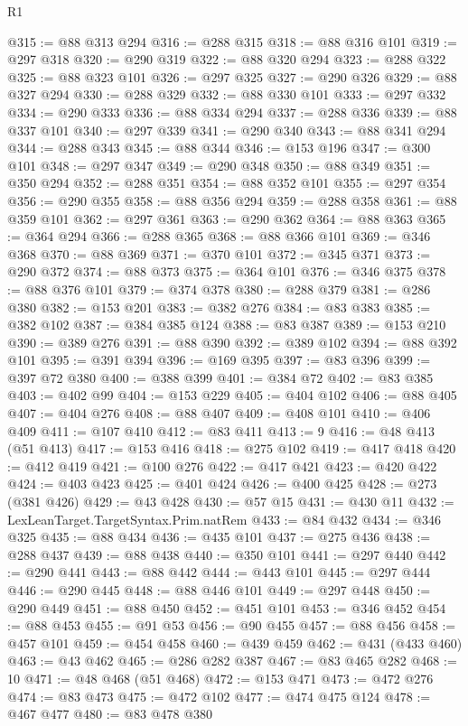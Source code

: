 \begin{lexlean}{R1}
\begin{coremodule}
@315 := @88 @313 @294
@316 := @288 @315
@318 := @88 @316 @101
@319 := @297 @318
@320 := @290 @319
@322 := @88 @320 @294
@323 := @288 @322
@325 := @88 @323 @101
@326 := @297 @325
@327 := @290 @326
@329 := @88 @327 @294
@330 := @288 @329
@332 := @88 @330 @101
@333 := @297 @332
@334 := @290 @333
@336 := @88 @334 @294
@337 := @288 @336
@339 := @88 @337 @101
@340 := @297 @339
@341 := @290 @340
@343 := @88 @341 @294
@344 := @288 @343
@345 := @88 @344
@346 := @153 @196
@347 := @300 @101
@348 := @297 @347
@349 := @290 @348
@350 := @88 @349
@351 := @350 @294
@352 := @288 @351
@354 := @88 @352 @101
@355 := @297 @354
@356 := @290 @355
@358 := @88 @356 @294
@359 := @288 @358
@361 := @88 @359 @101
@362 := @297 @361
@363 := @290 @362
@364 := @88 @363
@365 := @364 @294
@366 := @288 @365
@368 := @88 @366 @101
@369 := @346 @368
@370 := @88 @369
@371 := @370 @101
@372 := @345 @371
@373 := @290 @372
@374 := @88 @373
@375 := @364 @101
@376 := @346 @375
@378 := @88 @376 @101
@379 := @374 @378
@380 := @288 @379
@381 := @286 @380
@382 := @153 @201
@383 := @382 @276
@384 := @83 @383
@385 := @382 @102
@387 := @384 @385 @124
@388 := @83 @387
@389 := @153 @210
@390 := @389 @276
@391 := @88 @390
@392 := @389 @102
@394 := @88 @392 @101
@395 := @391 @394
@396 := @169 @395
@397 := @83 @396
@399 := @397 @72 @380
@400 := @388 @399
@401 := @384 @72
@402 := @83 @385
@403 := @402 @99
@404 := @153 @229
@405 := @404 @102
@406 := @88 @405
@407 := @404 @276
@408 := @88 @407
@409 := @408 @101
@410 := @406 @409
@411 := @107 @410
@412 := @83 @411
@413 := 9
@416 := @48 @413 (@51 @413)
@417 := @153 @416
@418 := @275 @102
@419 := @417 @418
@420 := @412 @419
@421 := @100 @276
@422 := @417 @421
@423 := @420 @422
@424 := @403 @423
@425 := @401 @424
@426 := @400 @425
@428 := @273 (@381 @426)
@429 := @43 @428
@430 := @57 @15
@431 := @430 @11
@432 := LexLeanTarget.TargetSyntax.Prim.natRem
@433 := @84 @432
@434 := @346 @325
@435 := @88 @434
@436 := @435 @101
@437 := @275 @436
@438 := @288 @437
@439 := @88 @438
@440 := @350 @101
@441 := @297 @440
@442 := @290 @441
@443 := @88 @442
@444 := @443 @101
@445 := @297 @444
@446 := @290 @445
@448 := @88 @446 @101
@449 := @297 @448
@450 := @290 @449
@451 := @88 @450
@452 := @451 @101
@453 := @346 @452
@454 := @88 @453
@455 := @91 @53
@456 := @90 @455
@457 := @88 @456
@458 := @457 @101
@459 := @454 @458
@460 := @439 @459
@462 := @431 (@433 @460)
@463 := @43 @462
@465 := @286 @282 @387
@467 := @83 @465 @282
@468 := 10
@471 := @48 @468 (@51 @468)
@472 := @153 @471
@473 := @472 @276
@474 := @83 @473
@475 := @472 @102
@477 := @474 @475 @124
@478 := @467 @477
@480 := @83 @478 @380

\end{coremodule}
\end{lexlean}
